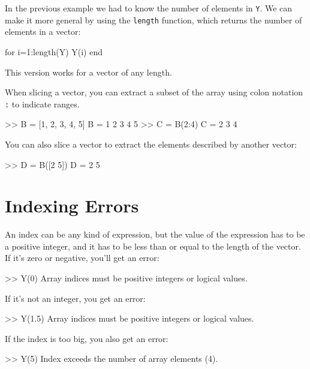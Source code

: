 
In the previous example we had to know the number
of elements in \lstinline{Y}.  We can make it more general by using
the \lstinline{length} function, which returns the number of elements
in a vector:

\begin{code}
for i=1:length(Y)
     Y(i)
end
\end{code}

This version works for a vector of any length.

When slicing a vector, you can extract a subset of the array using colon notation \lstinline{:} to indicate ranges.
\begin{code}
    >> B = [1, 2, 3, 4, 5]
    B =
         1     2     3     4     5
    >> C = B(2:4)
    C =
         2     3     4
\end{code}

You can also slice a vector to extract the elements described by another vector:
\begin{code}
    >> D = B([2 5])
    D =
         2     5
\end{code}

\section{Indexing Errors}


An index can be any kind of expression, but the value of the
expression has to be a positive integer, and it has to be
less than or equal to the length of the vector.  If it's
zero or negative, you'll get an error:

\begin{code}
>> Y(0)
Array indices must be positive integers or logical values.
\end{code}

If it's not an integer, you get an error:

\begin{code}
>> Y(1.5)
Array indices must be positive integers or logical values.
\end{code}

If the index is too big, you also get an error:

\begin{code}
>> Y(5)
Index exceeds the number of array elements (4).
\end{code}

